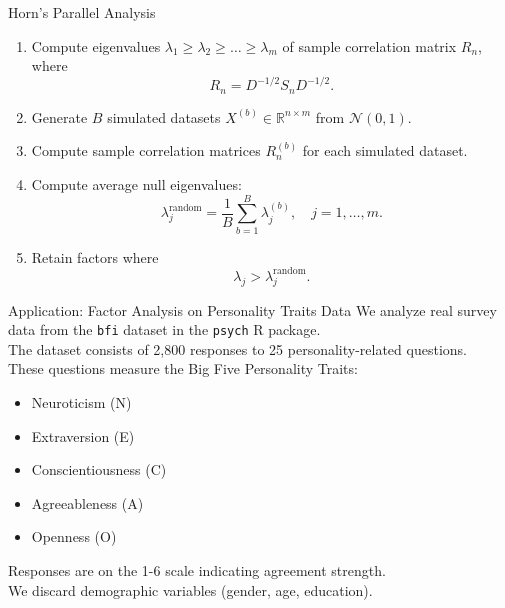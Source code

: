 \documentclass[11pt,handout,aspectratio=169]{beamer}
\begin{document}
\begin{frame}{Horn's Parallel Analysis}
  \begin{enumerate}
    \item Compute eigenvalues \( \lambda_1 \geq \lambda_2 \geq \dots \geq \lambda_m \) of sample correlation matrix \( R_n \), where
    \begin{equation}
      R_n = D^{-1/2} S_n D^{-1/2}.
    \end{equation}
    \item Generate \( B \) simulated datasets \( X^{(b)} \in \mathbb{R}^{n \times m} \) from \( \mathcal{N}(0,1) \).
    \item Compute sample correlation matrices \( R_n^{(b)} \) for each simulated dataset.
    \item Compute average null eigenvalues:
    \begin{equation}
      \lambda_j^{\text{random}} = \frac{1}{B} \sum_{b=1}^{B} \lambda_j^{(b)}, \quad j = 1, \dots, m.
    \end{equation}
    \item Retain factors where
    \begin{equation}
      \lambda_j > \lambda_j^{\text{random}}.
    \end{equation}
  \end{enumerate}
\end{frame}


\begin{frame}{Application: Factor Analysis on Personality Traits Data}
We analyze real survey data from the \texttt{bfi} dataset in the \texttt{psych} R package.\\[4mm]
The dataset consists of 2,800 responses to 25 personality-related questions.\\[4mm]
These questions measure the Big Five Personality Traits:
    \begin{itemize}
      \item Neuroticism (N)
      \item Extraversion (E)
      \item Conscientiousness (C)
      \item Agreeableness (A)
      \item Openness (O)
    \end{itemize}
Responses are on the 1-6 scale indicating agreement strength.\\[4mm]

We discard demographic variables (gender, age, education).
\end{frame}
\end{document}
